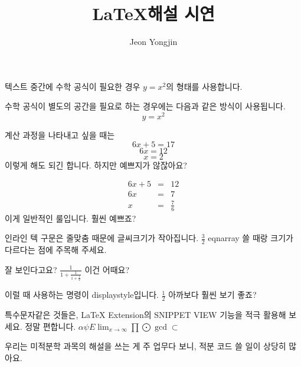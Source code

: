 \documentclass{article}
\author{Jeon Yongjin}
\title{\LaTeX 해설 시연}
\date{}
\begin{document}
\maketitle

텍스트 중간에 수학 공식이 필요한 경우 \( y=x^2 \)의 형태를 사용합니다.


수학 공식이 별도의 공간을 필요로 하는 경우에는 다음과 같은 방식이 사용됩니다. \[ y=x^2 \]

계산 과정을 나타내고 싶을 때는
\[6x + 5 = 17\]
\[6x = 12\]
\[x = 2\]
이렇게 해도 되긴 합니다. 하지만 예쁘지가 않잖아요?

\begin{eqnarray*}
    6x + 5 &=& 12 \\
    6x &=& 7 \\
    x &=& \frac{7}{6}
\end{eqnarray*}
이게 일반적인 룰입니다. 훨씬 예쁘죠?

인라인 텍 구문은 줄맞춤 때문에 글씨크기가 작아집니다. \( \frac{3}{2} \) eqnarray 쓸 때랑 크기가 다르다는 점에 주목해 주세요.

잘 보인다고요? \(\frac{1}{1+\frac{1}{1+\frac{1}{2}}}\) 이건 어때요?

이럴 때 사용하는 명령이 displaystyle입니다. \( \displaystyle \frac{1}{2} \) 아까보다 훨씬 보기 좋죠?

특수문자같은 것들은, LaTeX Extension의 SNIPPET VIEW 기능을 적극 활용해 보세요. 정말 편합니다.
\(\alpha \psi E \lim_{x \to \infty} \prod \bigodot \gcd \subset \)

우리는 미적분학 과목의 해설을 쓰는 게 주 업무다 보니, 적분 코드 쓸 일이 상당히 많아요.
\end{document}
